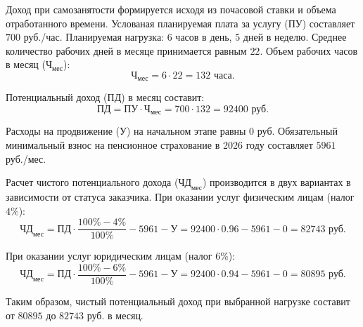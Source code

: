Доход при самозанятости формируется исходя из почасовой ставки и объема отработанного времени. 
Услованая планируемая плата за услугу ($\text{ПУ}$) составляет $700$ руб./час. 
Планируемая нагрузка: $6$ часов в день, $5$ дней в неделю. Среднее количество рабочих дней в месяце принимается равным $22$.
Объем рабочих часов в месяц ($\text{Ч}_{\text{мес}}$):
\begin{equation}
    \text{Ч}_{\text{мес}} = 6 \cdot 22 = 132 \text{ часа.}
\end{equation}

Потенциальный доход ($\text{ПД}$) в месяц составит:
\begin{equation}
    \text{ПД} = \text{ПУ} \cdot \text{Ч}_{\text{мес}} = 700 \cdot 132 = 92400 \text{ руб.}
\end{equation}

Расходы на продвижение ($\text{У}$) на начальном этапе равны $0$ руб.
Обязательный минимальный взнос на пенсионное страхование в 2026 году составляет $5961$ руб./мес.

Расчет чистого потенциального дохода ($\text{ЧД}_{\text{мес}}$) производится в двух вариантах в зависимости от статуса заказчика.
При оказании услуг физическим лицам (налог $4\%$):
\begin{equation}
    \text{ЧД}_{\text{мес}} = \text{ПД} \cdot \frac{100\% - 4\%}{100\%} - 5961 - \text{У} = 92400 \cdot 0.96 - 5961 - 0 = 82743 \text{ руб.}
\end{equation}

При оказании услуг юридическим лицам (налог $6\%$):
\begin{equation}
    \text{ЧД}_{\text{мес}} = \text{ПД} \cdot \frac{100\% - 6\%}{100\%} - 5961 - \text{У} = 92400 \cdot 0.94 - 5961 - 0 = 80895 \text{ руб.}
\end{equation}

Таким образом, чистый потенциальный доход при выбранной нагрузке составит от $80895$ до $82743$ руб. в месяц.